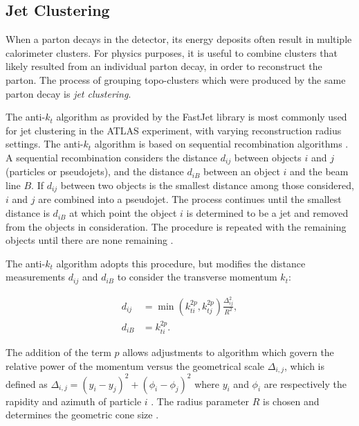 \subsection{Jet Clustering}
\label{sec:jet_cluster}
When a parton decays in the detector, its energy deposits often result in multiple calorimeter clusters. For physics purposes, it is useful to combine clusters that likely resulted from an individual parton decay, in order to reconstruct the parton. The process of grouping topo-clusters which were produced by the same parton decay is \textit{jet clustering}. \par

The anti-$k_t$ algorithm \cite{anti_kt} as provided by the FastJet library \cite{fast_jet} is most commonly used for jet clustering in the ATLAS experiment, with varying reconstruction radius settings. The anti-$k_t$ algorithm is based on sequential recombination algorithms \cite{seq_comb_alg}. A sequential recombination considers the distance $d_{ij}$ between objects $i$ and $j$ (particles or pseudojets), and the distance $d_{iB}$ between an object $i$ and the beam line $B$. If $d_{ij}$ between two objects is the smallest distance among those considered, $i$ and $j$ are combined into a pseudojet. The process continues until the smallest distance is $d_{iB}$ at which point the object $i$ is determined to be a jet and removed from the objects in consideration. The procedure is repeated with the remaining objects until there are none remaining \cite{anti_kt}. \par

The anti-$k_t$ algorithm adopts this procedure, but modifies the distance measurements $d_{ij}$ and $d_{iB}$ to consider the transverse momentum $k_t$:

\begin{subequations}
       	\begin{align}
		d_{ij} &= \min{(k_{ti}^{2p},k_{tj}^{2p})}\frac{\Delta_{ij}^{2}}{R^2}, \\
		d_{iB} &= k_{ti}^{2p} .
	\end{align}
\end{subequations}

The addition of the term $p$ allows adjustments to algorithm which govern the relative power of the momentum versus the geometrical scale $\Delta_{i,j}$, which is defined as $\Delta_{i,j} = (y_i - y_j)^2 + (\phi_i - \phi_j)^2$ where $y_i$ and $\phi_i$ are respectively the rapidity and azimuth of particle $i$ \cite{anti_kt}. The radius parameter $R$ is chosen and determines the geometric cone size \cite{seq_comb_alg}. \par

